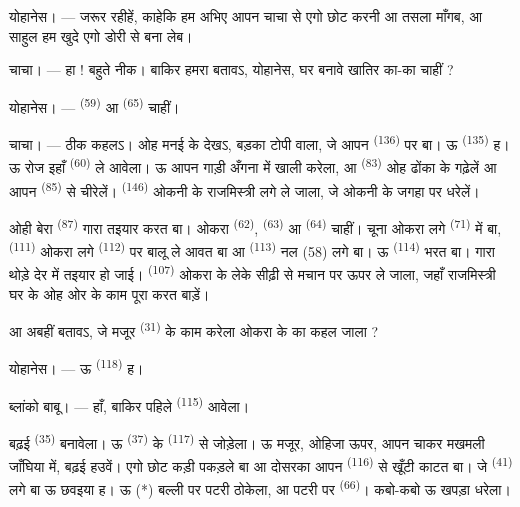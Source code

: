 \textsc{योहानेस}। --- जरूर रहीहें, काहेकि हम अभिए आपन चाचा से एगो छोट
करनी आ तसला माँगब, आ साहुल हम खुदे एगो डोरी से बना लेब।

\VUsaut{3.0mm}
\VUsaut{3.0mm}

\textsc{चाचा}। --- हा ! बहुते नीक। बाकिर हमरा बतावऽ, योहानेस, घर बनावे
खातिर का-का चाहीं ?

\textsc{योहानेस}। ---  \textsuperscript{(59)} आ
 \textsuperscript{(65)} चाहीं।

\textsc{चाचा}। --- ठीक कहलऽ। ओह मनई के देखऽ, बड़का टोपी वाला, जे आपन
 \textsuperscript{(136)} पर बा। ऊ 
\textsuperscript{(135)} ह। ऊ रोज इहाँ 
\textsuperscript{(60)} ले आवेला। ऊ आपन गाड़ी अँगना में खाली करेला, आ
 \textsuperscript{(83)} ओह ढोंका के गढ़ेलें आ आपन
 \textsuperscript{(85)} से चीरेलें। 
\textsuperscript{(146)} ओकनी के राजमिस्त्री लगे ले जाला, जे ओकनी के
जगहा पर धरेलें।

ओही बेरा  \textsuperscript{(87)} गारा तइयार करत
बा। ओकरा  \textsuperscript{(62)}, 
\textsuperscript{(63)} आ  \textsuperscript{(64)} चाहीं। चूना
ओकरा लगे  \textsuperscript{(71)} में बा,  \textsuperscript{(111)} ओकरा लगे  \textsuperscript{(112)}
पर बालू ले आवत बा आ  \textsuperscript{(113)} नल (58) लगे
बा। ऊ  \textsuperscript{(114)} भरत बा। गारा थोड़े देर में
तइयार हो जाई।  \textsuperscript{(107)} ओकरा के
लेके सीढ़ी से मचान पर ऊपर ले जाला, जहाँ राजमिस्त्री घर के ओह ओर के काम
पूरा करत बाड़ें।

आ अबहीं बतावऽ, जे मजूर  \textsuperscript{(31)} के काम करेला ओकरा
के का कहल जाला ?

\textsc{योहानेस}। --- ऊ  \textsuperscript{(118)} ह।

\VUsaut{3.0mm}
\VUsaut{3.0mm}

\textsc{ब्लांको बाबू}। --- हाँ, बाकिर पहिले 
\textsuperscript{(115)} आवेला।

बढ़ई  \textsuperscript{(35)} बनावेला। ऊ
 \textsuperscript{(37)} के  \textsuperscript{(117)}
से जोड़ेला। ऊ मजूर, ओहिजा ऊपर, आपन चाकर मखमली जाँघिया में, बढ़ई हउवें।
एगो छोट कड़ी पकड़ले बा आ दोसरका आपन  \textsuperscript{(116)}
से खूँटी काटत बा। जे  \textsuperscript{(41)} लगे बा ऊ
छवइया ह। ऊ (*) बल्ली पर पटरी ठोकेला, आ पटरी पर 
\textsuperscript{(66)}। कबो-कबो ऊ खपड़ा धरेला।

